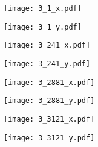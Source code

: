 \documentclass[8pt]{beamer}
\begin{document}
\begin{frame}
\center
\texttt{[image: 3\_1\_x.pdf]}
\end{frame}
\begin{frame}
\center
\texttt{[image: 3\_1\_y.pdf]}
\end{frame}
\begin{frame}
\center
\texttt{[image: 3\_241\_x.pdf]}
\end{frame}
\begin{frame}
\center
\texttt{[image: 3\_241\_y.pdf]}
\end{frame}
\begin{frame}
\center
\texttt{[image: 3\_2881\_x.pdf]}
\end{frame}
\begin{frame}
\center
\texttt{[image: 3\_2881\_y.pdf]}
\end{frame}
\begin{frame}
\center
\texttt{[image: 3\_3121\_x.pdf]}
\end{frame}
\begin{frame}
\center
\texttt{[image: 3\_3121\_y.pdf]}
\end{frame}
\end{document}
